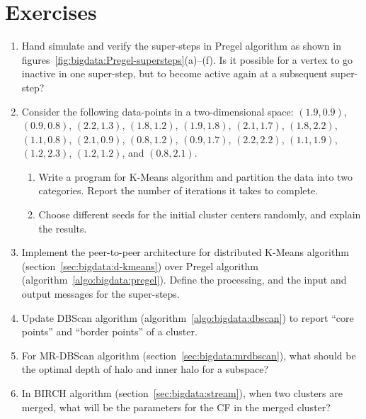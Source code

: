 
\section*{Exercises}

\begin{enumerate}
	\item Hand simulate and verify the super-steps in Pregel algorithm as shown in figures~\ref{fig:bigdata:Pregel-supersteps}(a)--(f).
		Is it possible for a vertex to go inactive in one super-step, but to become active again at a subsequent super-step?
	\item Consider the following data-points in a two-dimensional space: 
		$(1.9,0.9)$, $(0.9,0.8)$, $(2.2,1.3)$, $(1.8,1.2)$, $(1.9,1.8)$, $(2.1,1.7)$, $(1.8,2.2)$, $(1.1,0.8)$, $(2.1,0.9)$, 
		$(0.8,1.2)$, $(0.9,1.7)$, $(2.2,2.2)$, $(1.1,1.9)$, $(1.2,2.3)$, $(1.2,1.2)$, and $(0.8,2.1)$. 

		\begin{enumerate}
			\item Write a program for K-Means algorithm and partition the data into two categories. Report the number
				of iterations it takes to complete.
			\item Choose different seeds for the initial cluster centers randomly, and explain the results.
		\end{enumerate}
	\item Implement the peer-to-peer architecture for distributed K-Means algorithm~\citep{Bandopadhyay:2006} 
		(section~\ref{sec:bigdata:d-kmeans}) over Pregel algorithm (algorithm~\ref{algo:bigdata:pregel}). Define the
		processing, and the input and output messages for the super-steps.
	\item Update DBScan algorithm (algorithm~\ref{algo:bigdata:dbscan}) to report ``core points'' and ``border points''
		of a cluster.
	\item For MR-DBScan algorithm (section~\ref{sec:bigdata:mrdbscan}), what should be the optimal depth of halo and inner halo 
		for a subspace?
	\item In BIRCH algorithm (section~\ref{sec:bigdata:stream}), when two clusters are merged, what will be the parameters for 
		the CF in the merged cluster?
\end{enumerate}
